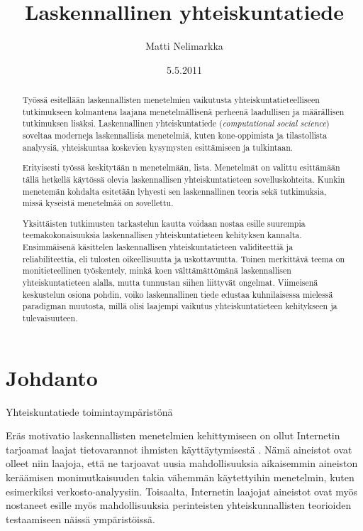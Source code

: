 \documentclass[finnish,gradu,twoside,12pt]{tktltiki}
\begin{document}
\onehalfspacing

\title{Laskennallinen yhteiskuntatiede}
\author{Matti Nelimarkka}
\date{5.5.2011}

\numberofpagesinformation{}

\keywords{}

\maketitle

\begin{abstract}
Työssä esitellään laskennallisten menetelmien vaikutusta yhteiskuntatieteelliseen tutkimukseen kolmantena laajana menetelmällisenä perheenä laadullisen ja määrällisen tutkimuksen lisäksi. Laskennallinen yhteiskuntatiede (\textit{computational social science}) soveltaa moderneja laskennallisia menetelmiä, kuten kone-oppimista ja tilastollista analyysiä, yhteiskuntaa koskevien kysymysten esittämiseen ja tulkintaan.

Erityisesti työssä keskitytään n menetelmään, lista. Menetelmät on valittu esittämään tällä hetkellä käytössä olevia laskennallisen yhteiskuntatieteen sovelluskohteita. Kunkin menetemän kohdalta esitetään lyhyesti sen laskennallinen teoria sekä tutkimuksia, missä kyseistä menetelmää on sovellettu.

Yksittäisten tutkimusten tarkastelun kautta voidaan nostaa esille suurempia teemakokonaisuuksia laskennallisen yhteiskuntatieteen kehityksen kannalta. Ensimmäisenä käsittelen laskennallisen yhteiskuntatieteen validiteettiä ja reliabiliteettia, eli tulosten oikeellisuutta ja uskottavuutta. Toinen merkittävä teema on monitieteellinen työskentely, minkä koen välttämättömänä laskennallisen yhteiskuntatieteen alalla, mutta tunnustan siihen liittyvät ongelmat. Viimeisenä keskustelun osiona pohdin, voiko laskennallinen tiede edustaa kuhnilaisessa mielessä paradigman muutosta, millä olisi laajempi vaikutus yhteiskuntatieteen kehitykseen ja tulevaisuuteen.
\end{abstract}

\mytableofcontents

\section{Johdanto}

Yhteiskuntatiede toimintaympäristönä

Eräs motivatio laskennallisten menetelmien kehittymiseen on ollut Internetin tarjoamat laajat tietovarannot ihmisten käyttäytymisestä \citep{}. Nämä aineistot ovat olleet niin laajoja, että ne tarjoavat uusia mahdollisuuksia aikaisemmin aineiston keräämisen monimutkaisuuden takia vähemmän käytettyihin menetelmin, kuten esimerkiksi verkosto-analyysiin. Toisaalta, Internetin laajojat aineistot ovat myös nostaneet esille myös mahdollisuuksia perinteisten yhteiskunnallisten teorioiden testaamiseen näissä ympäristöissä.
\end{document}
